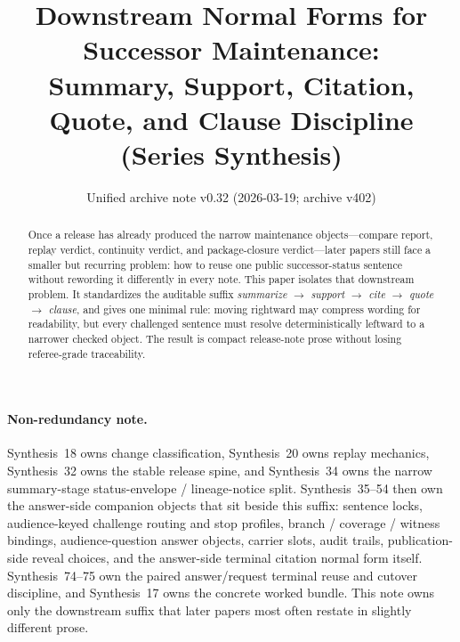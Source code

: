 \documentclass[11pt]{article}
\title{Downstream Normal Forms for Successor Maintenance:\\[0.5ex]
\large Summary, Support, Citation, Quote, and Clause Discipline (Series Synthesis)}
\author{}
\date{Unified archive note v0.32 (2026-03-19; archive v402)}
\begin{document}
\maketitle

\begin{abstract}
Once a release has already produced the narrow maintenance objects---compare report, replay verdict, continuity verdict, and package-closure verdict---later papers still face a smaller but recurring problem: how to reuse one public successor-status sentence without rewording it differently in every note.
This paper isolates that downstream problem.
It standardizes the auditable suffix
\emph{summarize $\to$ support $\to$ cite $\to$ quote $\to$ clause},
and gives one minimal rule: moving rightward may compress wording for readability, but every challenged sentence must resolve deterministically leftward to a narrower checked object.
The result is compact release-note prose without losing referee-grade traceability.
\end{abstract}

\paragraph{Non-redundancy note.}
Synthesis~18 owns change classification, Synthesis~20 owns replay mechanics, Synthesis~32 owns the stable release spine, and Synthesis~34 owns the narrow summary-stage status-envelope / lineage-notice split. Synthesis~35--54 then own the answer-side companion objects that sit beside this suffix: sentence locks, audience-keyed challenge routing and stop profiles, branch / coverage / witness bindings, audience-question answer objects, carrier slots, audit trails, publication-side reveal choices, and the answer-side terminal citation normal form itself. Synthesis~74--75 own the paired answer/request terminal reuse and cutover discipline, and Synthesis~17 owns the concrete worked bundle.\cite{series:statusenvelopes,series:sentencelocks,series:challengeroutes,series:challengestops,series:challengebranches,series:challengecoverage,series:challengesurfacehooks,series:challengeterminalwitnesses,series:challengecoveragewitnesspacks,series:challengecoveragewitnessslices,series:challengecoveragewitnesscores,series:challengeanswercapsules,series:challengeanswersheets,series:challengeanswercards,series:challengeanswercarrierslots,series:challengeansweraudittrails,series:challengeanswercitationdockets,series:challengeanswerpublicationprofiles,series:challengeanswerdisclosurepackets,series:challengeanswerescalationladders,series:challengeanswerreviewmenus,series:pairedterminalcitationdiscipline,series:pairedterminalcutoverrules,series:workedexample}
This note owns only the downstream suffix that later papers most often restate in slightly different prose.
\end{document}
